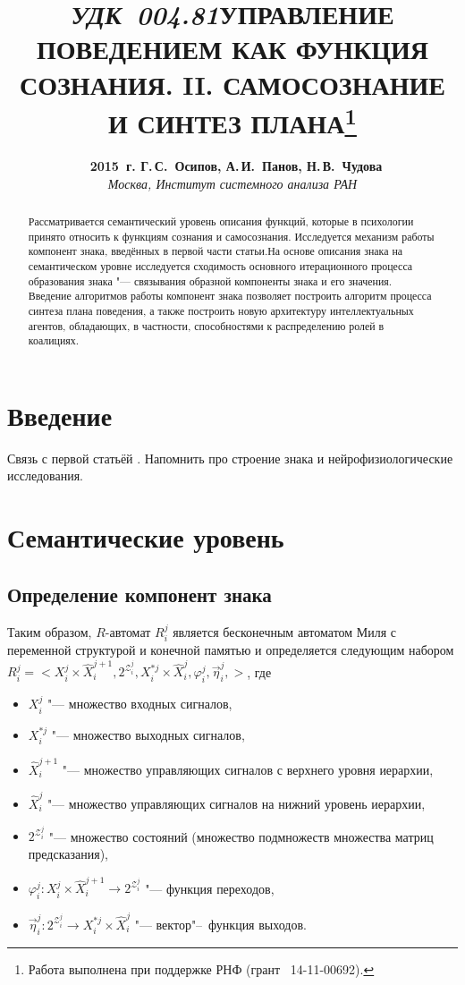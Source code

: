 \documentclass[a4paper, 12pt]{article}
\title{\hbox{\normalsize\textit{УДК 004.81}}\hbox{}\textbf{\Large\MakeUppercase{Управление поведением как функция сознания. II. Самосознание и синтез плана}}\footnote{Работа выполнена при поддержке РНФ (грант \No\ 14-11-00692).}}
\author{\textbf{\textcopyright~2015~г. Г.\,С.~Осипов, А.\,И.~Панов, Н.\,В.~Чудова}\\\normalsize\textit{Москва, Институт системного анализа РАН}}
\date{}
\theoremstyle{plain}
\begin{document}
	\vspace*{-5\baselineskip}			%
	{\let\newpage\relax\maketitle}
	
	\begin{abstract}
		\noindent Рассматривается семантический уровень описания функций, которые в психологии принято относить к функциям сознания и самосознания. Исследуется механизм работы компонент знака, введённых в первой части статьи.На основе описания знака на семантическом уровне исследуется сходимость основного итерационного процесса образования знака "--- связывания образной компоненты знака и его значения. Введение алгоритмов работы компонент знака позволяет построить алгоритм процесса синтеза плана поведения, а также построить новую архитектуру интеллектуальных агентов, обладающих, в частности, способностями к распределению ролей в коалициях.
	\end{abstract}	
	
	\section*{Введение}
	Связь с первой статьёй \cite{PanovA2014a}. Напомнить про строение знака и нейрофизиологические исследования.
	
	\section{Семантические уровень}
	\subsection{Определение компонент знака}
	Таким образом, $R$-автомат $R_i^j$ является бесконечным автоматом Миля с переменной структурой и конечной памятью и определяется следующим набором $R_i^j=<X_i^j\times \hat{X}_i^{j+1}, 2^{\mathcal Z_i^j}, X_i^{*j}\times \hat{X}_i^j,\varphi_i^j,\vec\eta_i^j,>$, где
	\begin{itemize}
		\item $X_i^j$ "--- множество входных сигналов, 
		\item $X_i^{*j}$ "--- множество выходных сигналов, 
		\item $\hat{X}_i^{j+1}$ "--- множество управляющих сигналов с верхнего уровня иерархии,
		\item $\hat{X}_i^j$ "--- множество управляющих сигналов на нижний уровень иерархии,
		\item $2^{\mathcal Z_i^j}$ "--- множество состояний (множество подмножеств множества матриц предсказания),
		\item $\varphi_i^j:X_i^j\times \hat{X}_i^{j+1}\to 2^{\mathcal Z_i^j}$ "--- функция переходов,
		\item $\vec\eta_i^j:2^{\mathcal Z_i^j} \to X_i^{*j}\times \hat{X}_i^j$ "--- вектор"--~функция выходов.
	\end{itemize}
	
\end{document}
